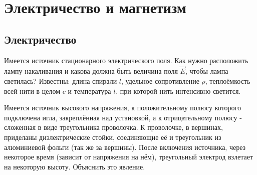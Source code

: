 \thispagestyle{empty}
\setcounter{page}{1}
\chapter{Электричество и магнетизм}
\clearpage
\section{Электричество}
\begin{problem}
Имеется источник стационарного электрического поля. Как нужно расположить лампу накаливания и какова должна быть величина поля $\vec{E}$, чтобы лампа светилась? Известны: длина спирали $l$, удельное сопротивление $\rho$, теплоёмкость всей нити в целом $c$ и температура $t$, при которой нить интенсивно светится.
\end{problem}
\begin{problem}
Имеется источник высокого напряжения, к положительному полюсу которого подключена игла, закреплённая над установкой, а к отрицательному полюсу - сложенная в виде треугольника проволочка. К проволочке, в вершинах, приделаны диэлектрические стойки, соединяющие её и треугольник из алюминиевой фольги (так же за вершины). После включения источника, через некоторое время (зависит от напряжения на нём), треугольный электрод взлетает на некоторую высоту. Объяснить это явление.
\end{problem}